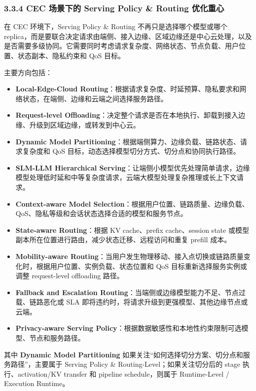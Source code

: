 \documentclass[a4paper,twocolumn,10pt]{ctexart}
\begin{document}
\subsubsection{3.3.4 CEC 场景下的 Serving Policy \& Routing 优化重心}



在 CEC 环境下，Serving Policy \& Routing 不再只是选择哪个模型或哪个 replica，而是要联合决定请求由端侧、接入边缘、区域边缘还是中心云处理，以及是否需要多级协同。它需要同时考虑请求复杂度、网络状态、节点负载、用户位置、状态副本、隐私约束和 QoS 目标。




主要方向包括：




\begin{itemize}
\item \textbf{Local-Edge-Cloud Routing}：根据请求复杂度、时延预算、隐私要求和网络状态，在端侧、边缘和云端之间选择服务路径。

\item \textbf{Request-level Offloading}：决定整个请求是否在本地执行、卸载到接入边缘、升级到区域边缘，或转发到中心云。

\item \textbf{Dynamic Model Partitioning}：根据端侧算力、边缘负载、链路状态、请求复杂度和 QoS 目标，动态选择模型切分方式、切分点和协同执行路径。

\item \textbf{SLM-LLM Hierarchical Serving}：让端侧小模型优先处理简单请求，边缘模型处理低时延和中等复杂度请求，云端大模型处理复杂推理或长上下文请求。

\item \textbf{Context-aware Model Selection}：根据用户位置、链路质量、边缘负载、QoS、隐私等级和会话状态选择合适的模型和服务节点。

\item \textbf{State-aware Routing}：根据 KV cache、prefix cache、session state 或模型副本所在位置进行路由，减少状态迁移、远程访问和重复 prefill 成本。

\item \textbf{Mobility-aware Routing}：当用户发生物理移动、接入点切换或链路质量变化时，根据用户位置、实例负载、状态位置和 QoS 目标重新选择服务实例或调整 request-level offloading 路径。

\item \textbf{Fallback and Escalation Routing}：当端侧或边缘模型能力不足、节点过载、链路恶化或 SLA 即将违约时，将请求升级到更强模型、其他边缘节点或云端。

\item \textbf{Privacy-aware Serving Policy}：根据数据敏感性和本地性约束限制可选模型、节点和服务路径。



\end{itemize}
其中 \textbf{Dynamic Model Partitioning} 如果关注“如何选择切分方案、切分点和服务路径”，主要属于 Serving Policy \& Routing-Level；如果关注切分后的 stage 执行、activation/KV transfer 和 pipeline schedule，则属于 Runtime-Level / Execution Runtime。
\end{document}
